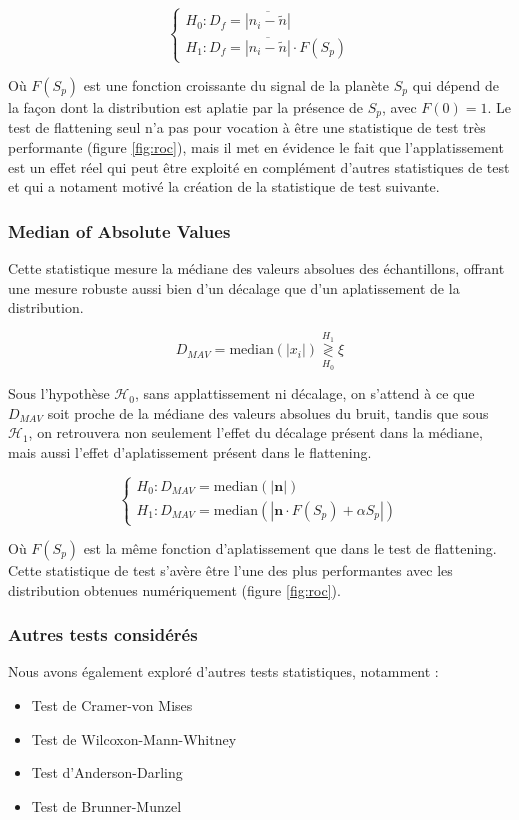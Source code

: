 \documentclass{article}
\begin{document}
$$
\begin{cases}
H_0 : D_f = \overline{|n_i - \tilde{n}|}\\
H_1 : D_f = \overline{|n_i - \tilde{n}|} \cdot F(S_p)
\end{cases}
$$

Où $F(S_p)$ est une fonction croissante du signal de la planète $S_p$ qui dépend de la façon dont la distribution est aplatie par la présence de $S_p$, avec $F(0)=1$. Le test de flattening seul n'a pas pour vocation à être une statistique de test très performante (figure \ref{fig:roc}), mais il met en évidence le fait que l'applatissement est un effet réel qui peut être exploité en complément d'autres statistiques de test et qui a notament motivé la création de la statistique de test suivante.

\subsubsection{Median of Absolute Values}

Cette statistique mesure la médiane des valeurs absolues des échantillons, offrant une mesure robuste aussi bien d'un décalage que d'un aplatissement de la distribution.

$$
D_{MAV} = \text{median}(|x_i|) \stackrel{H_1}{\underset{H_0}{\gtrless}} \xi
$$

Sous l'hypothèse $\mathcal{H}_0$, sans applattissement ni décalage, on s'attend à ce que $D_{MAV}$ soit proche de la médiane des valeurs absolues du bruit, tandis que sous $\mathcal{H}_1$, on retrouvera non seulement l'effet du décalage présent dans la médiane, mais aussi l'effet d'aplatissement présent dans le flattening.

$$
\begin{cases}
H_0 : D_{MAV} = \text{median}(|\mathbf{n}|)\\
H_1 : D_{MAV} = \text{median}(|\mathbf{n} \cdot F(S_p) + \alpha S_p|)
\end{cases}
$$

Où $F(S_p)$ est la même fonction d'aplatissement que dans le test de flattening. Cette statistique de test s'avère être l'une des plus performantes avec les distribution obtenues numériquement (figure \ref{fig:roc}).

\subsubsection{Autres tests considérés}\label{sec:other_tests}
Nous avons également exploré d'autres tests statistiques, notamment :
\begin{itemize}
    \item Test de Cramer-von Mises
    \item Test de Wilcoxon-Mann-Whitney
    \item Test d'Anderson-Darling
    \item Test de Brunner-Munzel
\end{itemize}
\end{document}
